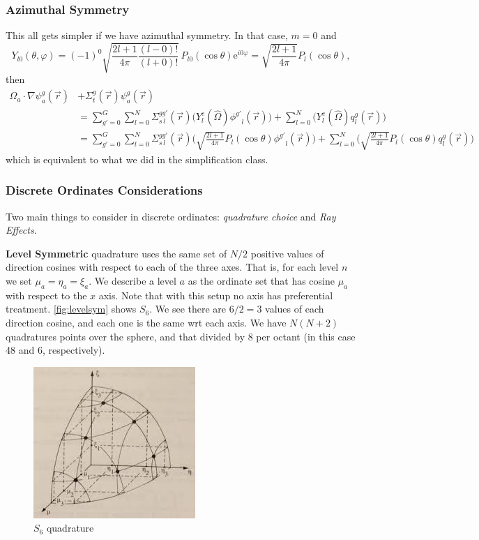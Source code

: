 \documentclass[12pt]{article}
\newcommand{\Macro}{\ensuremath{\Sigma}}
\newcommand{\vecr}{\ensuremath{\vec{r}}}
\newcommand{\vOmega}{\ensuremath{\hat{\Omega}}}
\newcommand{\evenp}{\ensuremath{\phi^{g'}}}
\newcommand{\sigg}[1]{\ensuremath{\Macro^{gg'}_{s\,#1}}}
\begin{document}
\subsubsection*{Azimuthal Symmetry}
This all gets simpler if we have azimuthal symmetry. In that case, $m=0$ and 
\[
  Y_{l0}(\theta,\varphi) = (-1)^0\sqrt
  {
    \frac{2l+1}{4\pi}\frac{(l-0)!}{(l+0)!}
  }\,
  P_{l0}(\cos\theta)\mathrm{e}^{i0\varphi} = \sqrt{\frac{2l+1}{4\pi}}P_{l}(\cos\theta),
\]
then 
\begin{align*}
\vOmega_a \cdot \nabla \psi^g_a(\vecr) &+ \Sigma^g_t(\vecr)\psi^g_a(\vecr)  \\
&=\sum_{g'=0}^G
  \sum_{l=0}^N
  \sigg{l}(\vec{r})
  \bigl(
  Y^e_{l}(\vOmega) \evenp_{l}(\vec{r}) \bigr)
+\sum_{l=0}^{N}\bigl(
  Y^e_{l}(\vOmega)q^g_{l}(\vecr)\bigr)\\
 &=\sum_{g'=0}^G
  \sum_{l=0}^N \sigg{l}(\vec{r})\bigl(\sqrt{\frac{2l+1}{4\pi}}P_{l}(\cos\theta)\evenp_{l}(\vec{r}) \bigr)
  + \sum_{l=0}^{N}\bigl(\sqrt{\frac{2l+1}{4\pi}}P_{l}(\cos\theta)q^g_{l}(\vecr)\bigr)
\end{align*}
which is equivalent to what we did in the simplification class.

\subsubsection*{Discrete Ordinates Considerations}
Two main things to consider in discrete ordinates: \textit{quadrature choice} and \textit{Ray Effects}. 

\textbf{Level Symmetric} quadrature uses the same set of $N/2$ positive values of direction cosines with respect to each of the three axes. That is, for each level $n$ we set $\mu_a = \eta_a = \xi_a$. We describe a level $a$ as the ordinate set that has cosine $\mu_a$ with respect to the $x$ axis. Note that with this setup no axis has preferential treatment. \autoref{fig:levelsym} shows $S_6$. We see there are $6/2 = 3$ values of each direction cosine, and each one is the same wrt each axis. We have $N(N+2)$ quadratures points over the sphere, and that divided by 8 per octant (in this case 48 and 6, respectively). 
\begin{figure}[h!]
    \begin{center}
    \includegraphics[keepaspectratio, width = 2.5 in]{level-sym}
    \end{center}
    \caption{$S_6$ quadrature}
    \label{fig:levelsym}
\end{figure}
\end{document}
